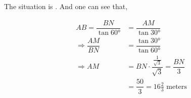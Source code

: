 \begin{solution}[\halfpage]
	The situation is \asif. And one can see that,
	
	\begin{align}
		AB = \dfrac{BN}{\tan\ang{60}} &= \dfrac{AM}{\tan\ang{30}} \\
		\Rightarrow \dfrac{AM}{BN} &= \dfrac{\tan\ang{30}}{\tan\ang{60}} \\
		\Rightarrow AM &= BN\cdot\dfrac{\frac{1}{\sqrt{3}}}{\sqrt{3}} = \dfrac{BN}{3} \\
		               &= \dfrac{50}{3} = 16\frac{2}{3}\text{ meters}
	\end{align}
\end{solution}

